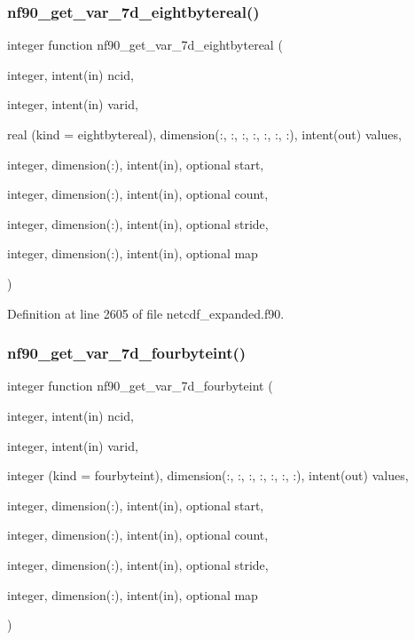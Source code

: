 \subsubsection{\texorpdfstring{nf90\+\_\+get\+\_\+var\+\_\+7d\+\_\+eightbytereal()}{nf90\_get\_var\_7d\_eightbytereal()}}
{\footnotesize\ttfamily integer function nf90\+\_\+get\+\_\+var\+\_\+7d\+\_\+eightbytereal (\begin{DoxyParamCaption}\item[{integer, intent(in)}]{ncid,  }\item[{integer, intent(in)}]{varid,  }\item[{real (kind = eightbytereal), dimension(\+:, \+:, \+:, \+:, \+:, \+:, \+:), intent(out)}]{values,  }\item[{integer, dimension(\+:), intent(in), optional}]{start,  }\item[{integer, dimension(\+:), intent(in), optional}]{count,  }\item[{integer, dimension(\+:), intent(in), optional}]{stride,  }\item[{integer, dimension(\+:), intent(in), optional}]{map }\end{DoxyParamCaption})}



Definition at line 2605 of file netcdf\+\_\+expanded.\+f90.

\mbox{\label{netcdf__expanded_8f90_aa272951274444d96dd207d571a349901}} 
\subsubsection{\texorpdfstring{nf90\+\_\+get\+\_\+var\+\_\+7d\+\_\+fourbyteint()}{nf90\_get\_var\_7d\_fourbyteint()}}
{\footnotesize\ttfamily integer function nf90\+\_\+get\+\_\+var\+\_\+7d\+\_\+fourbyteint (\begin{DoxyParamCaption}\item[{integer, intent(in)}]{ncid,  }\item[{integer, intent(in)}]{varid,  }\item[{integer (kind = fourbyteint), dimension(\+:, \+:, \+:, \+:, \+:, \+:, \+:), intent(out)}]{values,  }\item[{integer, dimension(\+:), intent(in), optional}]{start,  }\item[{integer, dimension(\+:), intent(in), optional}]{count,  }\item[{integer, dimension(\+:), intent(in), optional}]{stride,  }\item[{integer, dimension(\+:), intent(in), optional}]{map }\end{DoxyParamCaption})}



